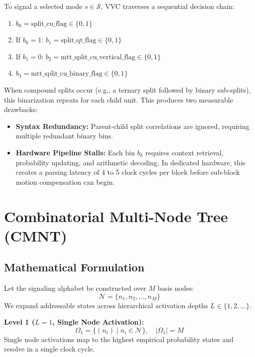 \documentclass[conference]{IEEEtran}
\begin{document}
To signal a selected mode $s \in \mathcal{S}$, VVC traverses a sequential decision chain:
\begin{enumerate}
    \item $b_0 = \text{split\_cu\_flag} \in \{0, 1\}$
    \item If $b_0 = 1$: $b_1 = \text{split\_qt\_flag} \in \{0, 1\}$
    \item If $b_1 = 0$: $b_2 = \text{mtt\_split\_cu\_vertical\_flag} \in \{0, 1\}$
    \item $b_3 = \text{mtt\_split\_cu\_binary\_flag} \in \{0, 1\}$
\end{enumerate}

When compound splits occur (e.g., a ternary split followed by binary sub-splits), this binarization repeats for each child unit. This produces two measurable drawbacks:
\begin{itemize}
    \item \textbf{Syntax Redundancy:} Parent-child split correlations are ignored, requiring multiple redundant binary bins.
    \item \textbf{Hardware Pipeline Stalls:} Each bin $b_k$ requires context retrieval, probability updating, and arithmetic decoding. In dedicated hardware, this creates a parsing latency of 4 to 5 clock cycles per block before sub-block motion compensation can begin.
\end{itemize}

\section{Combinatorial Multi-Node Tree (CMNT)}

\subsection{Mathematical Formulation}
Let the signaling alphabet be constructed over $M$ basis nodes:
\begin{equation}
\mathcal{N} = \{ n_1, n_2, \dots, n_M \}
\end{equation}
We expand addressable states across hierarchical activation depths $L \in \{1, 2, \dots\}$.

\textbf{Level 1 ($L=1$, Single Node Activation):}
\begin{equation}
\Omega_1 = \{ (n_i) \mid n_i \in \mathcal{N} \}, \quad |\Omega_1| = M
\end{equation}
Single node activations map to the highest empirical probability states and resolve in a single clock cycle.
\end{document}
